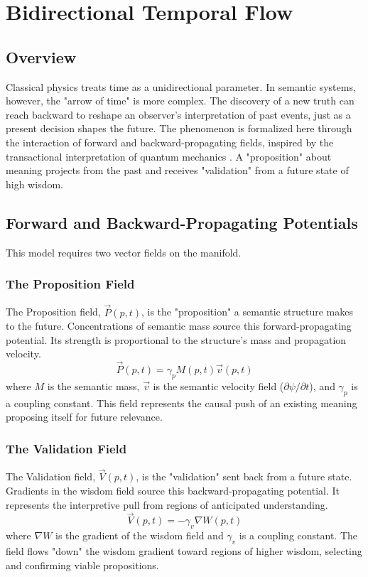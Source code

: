 \chapter{Bidirectional Temporal Flow}

\section{Overview}

Classical physics treats time as a unidirectional parameter. In semantic systems, however, the "arrow of time" is more complex. The discovery of a new truth can reach backward to reshape an observer's interpretation of past events, just as a present decision shapes the future. The phenomenon is formalized here through the interaction of forward and backward-propagating fields, inspired by the transactional interpretation of quantum mechanics \autocite{Cramer1986}. A "proposition" about meaning projects from the past and receives "validation" from a future state of high wisdom.

\section{Forward and Backward-Propagating Potentials}

This model requires two vector fields on the manifold.

\subsection{The Proposition Field}
The Proposition field, \(\vec{P}(p,t)\), is the "proposition" a semantic structure makes to the future. Concentrations of semantic mass source this forward-propagating potential. Its strength is proportional to the structure's mass and propagation velocity.
\begin{equation}
\vec{P}(p,t) = \gamma_p M(p,t) \vec{v}(p,t)
\end{equation}
where \(M\) is the semantic mass, \(\vec{v}\) is the semantic velocity field (\(\partial\psi/\partial t\)), and \(\gamma_p\) is a coupling constant. This field represents the causal push of an existing meaning proposing itself for future relevance.

\subsection{The Validation Field}
The Validation field, \(\vec{V}(p,t)\), is the "validation" sent back from a future state. Gradients in the wisdom field source this backward-propagating potential. It represents the interpretive pull from regions of anticipated understanding.
\begin{equation}
\vec{V}(p,t) = -\gamma_v \nabla W(p,t)
\end{equation}
where \(\nabla W\) is the gradient of the wisdom field and \(\gamma_v\) is a coupling constant. The field flows "down" the wisdom gradient toward regions of higher wisdom, selecting and confirming viable propositions.

